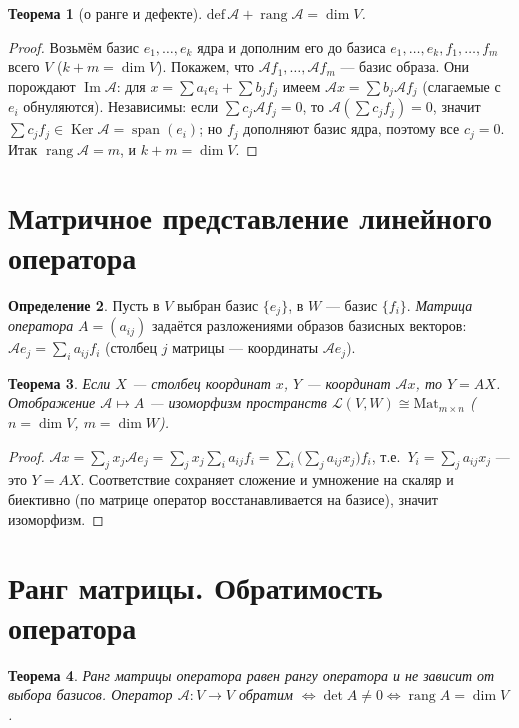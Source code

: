 \documentclass[11pt,a4paper]{article}
\theoremstyle{definition}
\newtheorem{definition}{Определение}[section]
\theoremstyle{plain}
\newtheorem{theorem}[definition]{Теорема}
\DeclareMathOperator{\rang}{rang}
\DeclareMathOperator{\Span}{span}
\DeclareMathOperator{\Ker}{Ker}
\DeclareMathOperator{\Img}{Im}
\begin{document}
\begin{theorem}[о ранге и дефекте]
$\mathrm{def}\,\mathcal A+\rang\mathcal A=\dim V$.
\end{theorem}

\begin{proof}
Возьмём базис $e_1,\dots,e_k$ ядра и дополним его до базиса $e_1,\dots,e_k,f_1,\dots,f_m$ всего $V$
($k+m=\dim V$). Покажем, что $\mathcal Af_1,\dots,\mathcal Af_m$ — базис образа. Они порождают
$\Img\mathcal A$: для $x=\sum a_ie_i+\sum b_jf_j$ имеем $\mathcal Ax=\sum b_j\mathcal Af_j$
(слагаемые с $e_i$ обнуляются). Независимы: если $\sum c_j\mathcal Af_j=0$, то
$\mathcal A(\sum c_jf_j)=0$, значит $\sum c_jf_j\in\Ker\mathcal A=\Span(e_i)$; но $f_j$ дополняют
базис ядра, поэтому все $c_j=0$. Итак $\rang\mathcal A=m$, и $k+m=\dim V$.
\end{proof}

\section{Матричное представление линейного оператора}

\begin{definition}
Пусть в $V$ выбран базис $\{e_j\}$, в $W$ — базис $\{f_i\}$. \emph{Матрица оператора}
$A=(a_{ij})$ задаётся разложениями образов базисных векторов: $\mathcal Ae_j=\sum_i a_{ij}f_i$
(столбец $j$ матрицы — координаты $\mathcal Ae_j$).
\end{definition}

\begin{theorem}
Если $X$ — столбец координат $x$, $Y$ — координат $\mathcal Ax$, то $Y=AX$. Отображение
$\mathcal A\mapsto A$ — изоморфизм пространств $\mathcal L(V,W)\cong\mathrm{Mat}_{m\times n}$
($n=\dim V$, $m=\dim W$).
\end{theorem}

\begin{proof}
$\mathcal Ax=\sum_j x_j\mathcal Ae_j=\sum_j x_j\sum_i a_{ij}f_i=\sum_i\bigl(\sum_j a_{ij}x_j\bigr)f_i$,
т.е.\ $Y_i=\sum_j a_{ij}x_j$ — это $Y=AX$. Соответствие сохраняет сложение и умножение на скаляр и
биективно (по матрице оператор восстанавливается на базисе), значит изоморфизм.
\end{proof}

\section{Ранг матрицы. Обратимость оператора}

\begin{theorem}
Ранг матрицы оператора равен рангу оператора и не зависит от выбора базисов. Оператор
$\mathcal A\colon V\to V$ обратим $\iff\det A\ne0\iff\rang A=\dim V$.
\end{theorem}
\end{document}
